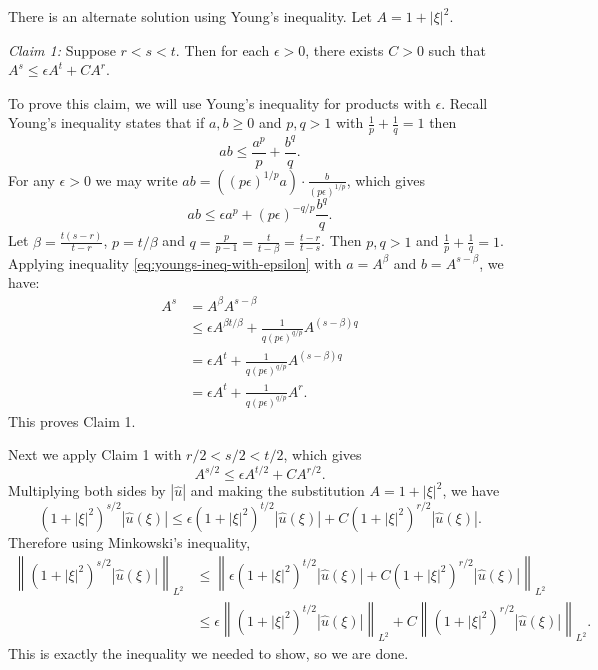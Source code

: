 \documentclass{exam}
\theoremstyle{problemstyle}
\newcommand{\norm}[1]{\left\lVert#1\right\rVert} %
\newcommand{\1}[1]{\textbf{1}_{\left[#1\right]}} %
\begin{document}
\begin{questions}
\begin{solution}
    There is an alternate solution using Young's inequality. Let $A = 1+|\xi|^{2}$. 
	
	\textit{Claim 1:} Suppose $r<s<t$. Then for each $\epsilon>0$, there exists $C>0$ such that $A^{s} \leq \epsilon A^{t}+ C A^{r}$.

To prove this claim, we will use Young's inequality for products with $\epsilon$. Recall Young's inequality states that if $a,b\geq 0$ and $p,q>1$ with $\frac{1}{p}+\frac{1}{q}=1$ then
\begin{equation*}
  ab\leq \frac{a^{p}}{p}+\frac{b^{q}}{q}.
\end{equation*}
For any $\epsilon>0$ we may write $ab= ((p\epsilon)^{1/p}a)\cdot \frac{b}{(p\epsilon)^{1/p}}$, which gives
\begin{equation}\label{eq:youngs-ineq-with-epsilon}
  ab\leq \epsilon a^{p} + (p\epsilon)^{-q/p}\frac{b^{q}}{q}.
\end{equation}
Let $\beta=\frac{t(s-r)}{t-r}$, $p=t/\beta$ and $q=\frac{p}{p-1}= \frac{t}{t-\beta} =\frac{t-r}{t-s}$. Then $p,q>1$ and $\frac{1}{p}+\frac{1}{q}=1$. Applying inequality \eqref{eq:youngs-ineq-with-epsilon} with $a=A^{\beta}$ and $b=A^{s-\beta}$, we have:
\begin{align*}
  A^{s} &= A^{\beta}A^{s-\beta}\\ 
        &\leq \epsilon A^{\beta t/\beta} + \frac{1}{q(p\epsilon)^{q/p}} A^{(s-\beta) q}\\ 
        &=\epsilon A^{t} + \frac{1}{q(p\epsilon)^{q/p}} A^{(s-\beta) q}\\
        &=\epsilon A^{t} +  \frac{1}{q(p\epsilon)^{q/p}} A^{r}.
\end{align*}
This proves Claim 1.

Next we apply Claim 1 with $r/2<s/2<t/2$, which gives
\begin{equation*}
  A^{s/2}\leq \epsilon A^{t/2}+ C A^{r/2}.
\end{equation*}
Multiplying both sides by $|\hat{u}|$ and making the substitution $A=1+|\xi|^{2}$, we have
\begin{equation*}
  (1+|\xi|^{2})^{s/2}|\hat{u}(\xi)|\leq \epsilon (1+|\xi|^{2})^{t/2}|\hat{u}(\xi)|+ C (1+|\xi|^{2})^{r/2}|\hat{u}(\xi)|.
\end{equation*}
Therefore using Minkowski's inequality,
\begin{align*}
    \norm{(1+|\xi|^{2})^{s/2}|\hat{u}(\xi)|}_{L^{2}}
  &\leq \norm{\epsilon (1+|\xi|^{2})^{t/2}|\hat{u}(\xi)|+ C (1+|\xi|^{2})^{r/2}|\hat{u}(\xi)|}_{L^{2}}\\ 
  &\leq  \epsilon\norm{(1+|\xi|^{2})^{t/2}|\hat{u}(\xi)|}_{L^{2}}+ C\norm{ (1+|\xi|^{2})^{r/2}|\hat{u}(\xi)|}_{L^{2}}.
\end{align*}
This is exactly the inequality we needed to show, so we are done.


\end{solution}
\end{questions}
\end{document}
